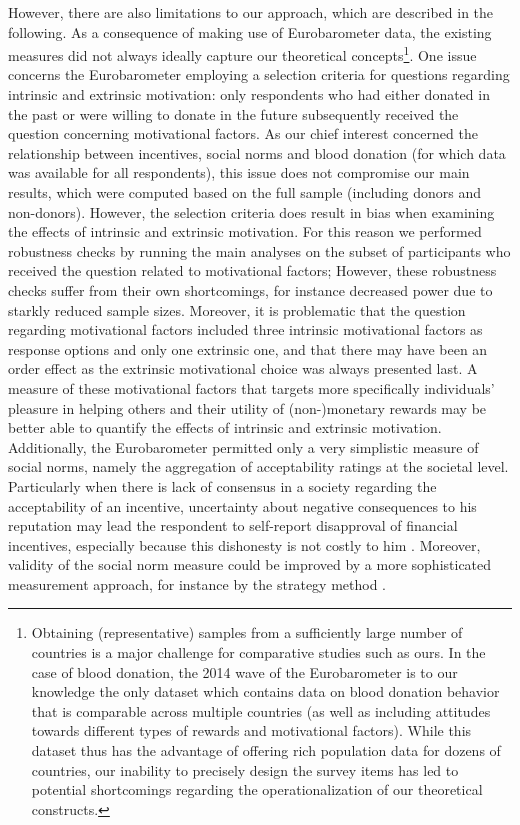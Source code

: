 \documentclass[AER]{AEA}
\begin{document}
However, there are also limitations to our approach, which are described in the following. As a consequence of making use of Eurobarometer data, the existing measures did not always ideally capture our theoretical concepts\footnote{ Obtaining (representative) samples from a sufficiently large number of countries is a major challenge for comparative studies such as ours. In the case of blood donation, the 2014 wave of the Eurobarometer is to our knowledge the only dataset which contains data on blood donation behavior that is comparable across multiple countries (as well as including attitudes towards different types of rewards and motivational factors). While this dataset thus has the advantage of offering rich population data for dozens of countries, our inability to precisely design the survey items has led to potential shortcomings regarding the operationalization of our theoretical constructs.}. 
One issue concerns the Eurobarometer employing a selection criteria for questions regarding intrinsic and extrinsic motivation: only respondents who had either donated in the past or were willing to donate in the future subsequently received the question concerning motivational factors. 
As our chief interest concerned the relationship between incentives, social norms and blood donation (for which data was available for all respondents), this issue does not compromise our main results, which were computed based on the full sample (including donors and non-donors). However, the selection criteria does result in bias when examining the effects of intrinsic and extrinsic motivation. For this reason we performed robustness checks by running the main analyses on the subset of participants who received the question related to motivational factors; However, these robustness checks suffer from their own shortcomings, for instance decreased power due to starkly reduced sample sizes.
Moreover, it is problematic that the question regarding motivational factors included three intrinsic motivational factors as response options and only one extrinsic one, and that there may have been an order effect as the extrinsic motivational choice was always presented last. A measure of these motivational factors that targets more specifically individuals’ pleasure in helping others and their utility of (non-)monetary rewards may be better able to quantify the effects of intrinsic and extrinsic motivation. Additionally, the Eurobarometer permitted only a very simplistic measure of social norms, namely the aggregation of acceptability ratings at the societal level. Particularly when there is lack of consensus in a society regarding the acceptability of an incentive, uncertainty about negative consequences to his reputation may lead the respondent to self-report disapproval of financial incentives, especially because this dishonesty is not costly to him \citep{diekmann_green_2003, rauhut_sociological_2010}. Moreover, validity of the social norm measure could be improved by a more sophisticated measurement approach, for instance by the strategy method \cite[see ][]{rauhut_sociological_2010}. 
\end{document}
